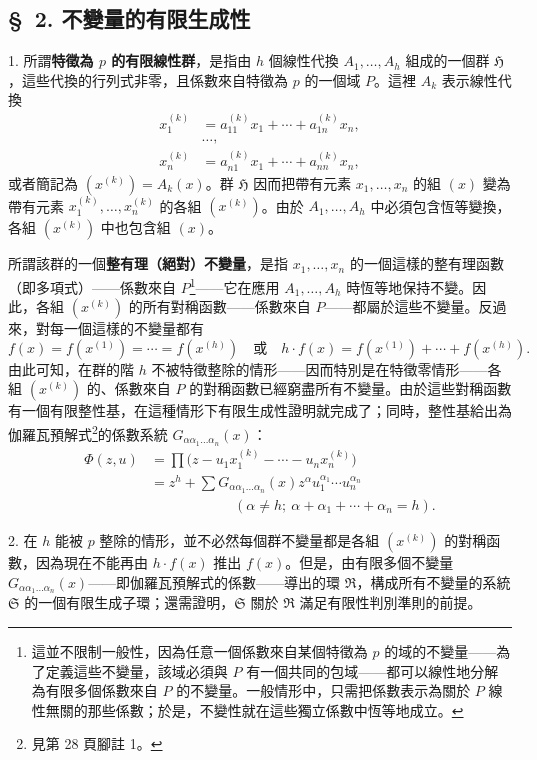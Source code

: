 \documentclass[11pt]{article}
\newcommand{\srcemph}[1]{\textbf{#1}}
\begin{document}
\subsection*{\S\ 2. 不變量的有限生成性}

1. 所謂\srcemph{特徵為 $p$ 的有限線性群}，是指由 $h$ 個線性代換 $A_1,\ldots,A_h$ 組成的一個群 $\mathfrak H$，這些代換的行列式非零，且係數來自特徵為 $p$ 的一個域 $P$。這裡 $A_k$ 表示線性代換
\[
\begin{aligned}
 x_1^{(k)}&=a_{11}^{(k)}x_1+\cdots+a_{1n}^{(k)}x_n,\\[-0.2em]
 &\ldots,\\[-0.2em]
 x_n^{(k)}&=a_{n1}^{(k)}x_1+\cdots+a_{nn}^{(k)}x_n,
\end{aligned}
\]
或者簡記為 $(x^{(k)})=A_k(x)$。群 $\mathfrak H$ 因而把帶有元素 $x_1,\ldots,x_n$ 的組 $(x)$ 變為帶有元素 $x_1^{(k)},\ldots,x_n^{(k)}$ 的各組 $(x^{(k)})$。由於 $A_1,\ldots,A_h$ 中必須包含恆等變換，各組 $(x^{(k)})$ 中也包含組 $(x)$。

所謂該群的一個\srcemph{整有理（絕對）不變量}，是指 $x_1,\ldots,x_n$ 的一個這樣的整有理函數（即多項式）——係數來自 $P$\footnote{這並不限制一般性，因為任意一個係數來自某個特徵為 $p$ 的域的不變量——為了定義這些不變量，該域必須與 $P$ 有一個共同的包域——都可以線性地分解為有限多個係數來自 $P$ 的不變量。一般情形中，只需把係數表示為關於 $P$ 線性無關的那些係數；於是，不變性就在這些獨立係數中恆等地成立。}——它在應用 $A_1,\ldots,A_h$ 時恆等地保持不變。因此，各組 $(x^{(k)})$ 的所有對稱函數——係數來自 $P$——都屬於這些不變量。反過來，對每一個這樣的不變量都有
\[
 f(x)=f(x^{(1)})=\cdots=f(x^{(h)})
 \quad\text{或}\quad
 h\cdot f(x)=f(x^{(1)})+\cdots+f(x^{(h)}).
\]
由此可知，在群的階 $h$ 不被特徵整除的情形——因而特別是在特徵零情形——各組 $(x^{(k)})$ 的、係數來自 $P$ 的對稱函數已經窮盡所有不變量。由於這些對稱函數有一個有限整性基，在這種情形下有限生成性證明就完成了；同時，整性基給出為伽羅瓦預解式\footnote{見第 28 頁腳註 1。}的係數系統 $G_{\alpha\alpha_1\ldots\alpha_n}(x)$：
\[
\begin{aligned}
\Phi(z,u)&=\prod\bigl(z-u_1x_1^{(k)}-\cdots-u_nx_n^{(k)}\bigr)\\
&=z^h+\sum G_{\alpha\alpha_1\ldots\alpha_n}(x)
 z^{\alpha}u_1^{\alpha_1}\cdots u_n^{\alpha_n}\\
&\hspace{6em}(\alpha\ne h;\ \alpha+\alpha_1+\cdots+\alpha_n=h).
\end{aligned}
\]

2. 在 $h$ 能被 $p$ 整除的情形，並不必然每個群不變量都是各組 $(x^{(k)})$ 的對稱函數，因為現在不能再由 $h\cdot f(x)$ 推出 $f(x)$。但是，由有限多個不變量 $G_{\alpha\alpha_1\ldots\alpha_n}(x)$——即伽羅瓦預解式的係數——導出的環 $\mathfrak R$，構成所有不變量的系統 $\mathfrak S$ 的一個有限生成子環；還需證明，$\mathfrak S$ 關於 $\mathfrak R$ 滿足有限性判別準則的前提。
\end{document}
